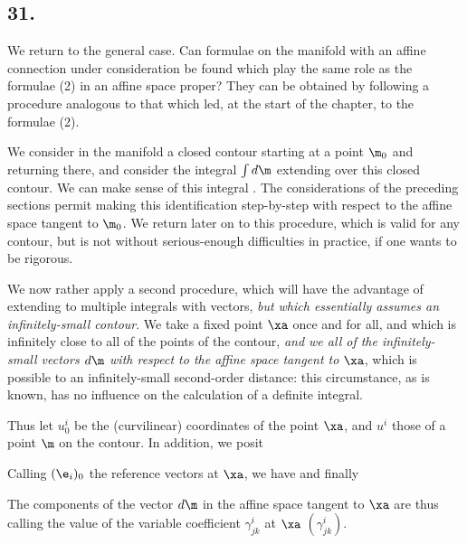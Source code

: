 \subsection*{31.}

We return to the general case. Can formulae on the manifold with an affine connection under consideration be found which play the same role as the formulae (2) in an affine space proper? They can be obtained by following a procedure analogous to that which led, at the start of the chapter, to the formulae (2).

We consider in the manifold a closed contour starting at a point $\m_0$ and returning there, and consider the integral $\int d\m$ extending over this closed contour. We can make sense of this integral . The considerations of the preceding sections permit making this identification step-by-step with respect to the affine space tangent to $\m_0$. We return later on to this procedure, which is valid for any contour, but is not without serious-enough difficulties in practice, if one wants to be rigorous.

We now rather apply a second procedure, which will have the advantage of extending to multiple integrals with vectors, \textit{but which essentially assumes an infinitely-small contour}. We take a fixed point $\xa$ once and for all, and which is infinitely close to all of the points of the contour, \textit{and we  all of the infinitely-small vectors $d\m$ with respect to the affine space tangent to $\xa$}, which is possible to an infinitely-small second-order distance: this circumstance, as is known, has no influence on the calculation of a definite integral.

Thus let $u_0^i$ be the (curvilinear) coordinates of the point $\xa$, and $u^i$ those of a point $\m$ on the contour. In addition, we posit

Calling $(\e_i)_0$ the reference vectors at $\xa$, we have
and finally

The components of the vector $d\m$ in the affine space tangent to $\xa$ are thus
calling the value of the variable coefficient $\gamma_{jk}^i$ at $\xa$ $(\gamma_{jk}^i)$.

